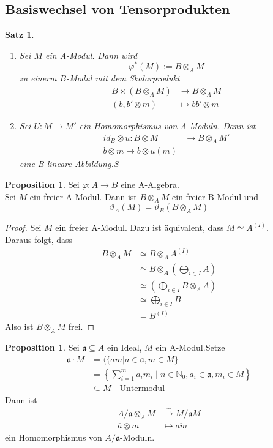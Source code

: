 \documentclass[10pt,a4paper]{article}
\newcommand{\N}{\ensuremath{\mathbb{N}}}
\newcommand{\ol}[1]{\overline{#1}}
\newcounter{thm}[section]
\theoremstyle{definition}
\newtheorem{prop}[thm]{Proposition}
\theoremstyle{plain}
\newtheorem{satz}[thm]{Satz}
\theoremstyle{remark}
\begin{document}
\subsection{Basiswechsel von Tensorprodukten}
\begin{satz}
	\begin{enumerate}
		\item Sei $M$ ein A-Modul. Dann wird
		\[\varphi^*(M):=B\otimes_A M\]
		zu einerm $B$-Modul mit dem Skalarprodukt
		\begin{align*}
		B\times(B\otimes_A M)&\rightarrow B\otimes_A M\\
		(b,b'\otimes m)&\mapsto bb'\otimes m
		\end{align*}
		\item Sei $U:M\rightarrow M'$ ein Homomorphismus von A-Moduln. Dann ist
		\begin{align*}
		id_B\otimes u:B\otimes M&\rightarrow  B\otimes_A M'\\
		b\otimes m\mapsto b\otimes u(m)
		\end{align*}
		eine B-lineare Abbildung.S
	\end{enumerate}
\end{satz}
\begin{prop}
	Sei $\varphi:A\rightarrow B$ eine A-Algebra.\\
	Sei $M$ ein freier A-Modul. Dann ist $B\otimes_A M$ ein freier B-Modul und
	\[\vartheta_A(M)=\vartheta_B(B\otimes_A M)\]
\end{prop}
\begin{proof}
	Sei $M$ ein freier A-Modul. Dazu ist äquivalent, dass $M\simeq A^{(I)}$.\\
	Daraus folgt, dass
	\begin{align*}
	B\otimes_A M&\simeq B\otimes_A A^{(I)}\\
	&\simeq B\otimes_A\left(\bigoplus_{i\in I}A\right)\\
	&\simeq \left(\bigoplus_{i\in I}B\otimes_A A\right)\\
	&\simeq\bigoplus_{i\in I}B\\
	&=B^{(I)}
	\end{align*}
	Also ist $B\otimes_A M$ frei.
\end{proof}
\begin{prop}
	Sei $\mathfrak{a}\subseteq A$ ein Ideal, $M$ ein A-Modul.Setze 
	\begin{align*}
	\mathfrak a\cdot M&=\langle \{am|a\in\mathfrak a,m\in M\}\\
	&=\left\{\sum_{i=1}^{m}a_im_i\mid n\in\N_0,a_i\in\mathfrak a,m_i\in M \right\}\\
	&\subseteq M \quad \text{Untermodul}
	\end{align*}
	Dann ist
	\begin{align*}
	A/\mathfrak a\otimes_A M&\xrightarrow{\sim} M/\mathfrak a M\\
	\ol a\otimes m&\mapsto \ol{am}
	\end{align*}
	ein Homomorphismus von $A/\mathfrak a$-Moduln.
\end{prop}
\end{document}
